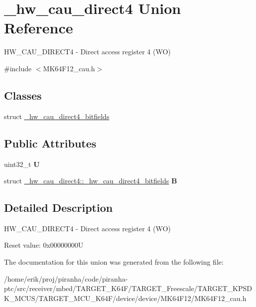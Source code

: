 \hypertarget{union__hw__cau__direct4}{}\section{\+\_\+hw\+\_\+cau\+\_\+direct4 Union Reference}
\label{union__hw__cau__direct4}


H\+W\+\_\+\+C\+A\+U\+\_\+\+D\+I\+R\+E\+C\+T4 -\/ Direct access register 4 (WO)  




{\ttfamily \#include $<$M\+K64\+F12\+\_\+cau.\+h$>$}

\subsection*{Classes}
\begin{DoxyCompactItemize}
\item 
struct \hyperlink{struct__hw__cau__direct4_1_1__hw__cau__direct4__bitfields}{\+\_\+hw\+\_\+cau\+\_\+direct4\+\_\+bitfields}
\end{DoxyCompactItemize}
\subsection*{Public Attributes}
\begin{DoxyCompactItemize}
\item 
uint32\+\_\+t {\bfseries U}\hypertarget{union__hw__cau__direct4_a89a6042b063c672381b41cdda261c135}{}\label{union__hw__cau__direct4_a89a6042b063c672381b41cdda261c135}

\item 
struct \hyperlink{struct__hw__cau__direct4_1_1__hw__cau__direct4__bitfields}{\+\_\+hw\+\_\+cau\+\_\+direct4\+::\+\_\+hw\+\_\+cau\+\_\+direct4\+\_\+bitfields} {\bfseries B}\hypertarget{union__hw__cau__direct4_a99ed32fdb890f4db2a552c561fce6782}{}\label{union__hw__cau__direct4_a99ed32fdb890f4db2a552c561fce6782}

\end{DoxyCompactItemize}


\subsection{Detailed Description}
H\+W\+\_\+\+C\+A\+U\+\_\+\+D\+I\+R\+E\+C\+T4 -\/ Direct access register 4 (WO) 

Reset value\+: 0x00000000U 

The documentation for this union was generated from the following file\+:\begin{DoxyCompactItemize}
\item 
/home/erik/proj/piranha/code/piranha-\/ptc/src/receiver/mbed/\+T\+A\+R\+G\+E\+T\+\_\+\+K64\+F/\+T\+A\+R\+G\+E\+T\+\_\+\+Freescale/\+T\+A\+R\+G\+E\+T\+\_\+\+K\+P\+S\+D\+K\+\_\+\+M\+C\+U\+S/\+T\+A\+R\+G\+E\+T\+\_\+\+M\+C\+U\+\_\+\+K64\+F/device/device/\+M\+K64\+F12/M\+K64\+F12\+\_\+cau.\+h\end{DoxyCompactItemize}
